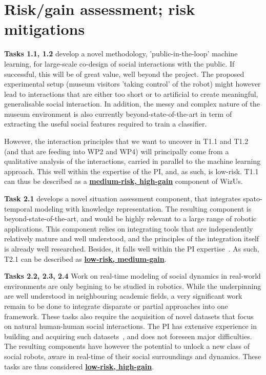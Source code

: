 \documentclass[11pt,a4paper]{report}
\newcommand{\project}{WizUs\xspace}
\begin{document}
\section{Risk/gain assessment; risk mitigations}\label{risks}

\textbf{Tasks 1.1, 1.2} develop a novel methodology, 'public-in-the-loop' machine
learning, for large-scale co-design of social interactions with the public. If
successful, this will be of great value, well beyond the project. The
proposed experimental setup (museum visitors 'taking control' of the robot)
might however lead to interactions that are either too short or to artificial to
create meaningful, generalisable social interaction. In addition, the messy and
complex nature of the museum environment is also currently beyond-state-of-the-art
in term of extracting the useful social features required to train a classifier.

However, the interaction principles that we want to uncover in T1.1 and T1.2
(and that are feeding into WP2 and WP4) will principally come from a qualitative
analysis of the interactions, carried in parallel to the machine learning
approach. This well within the expertise of the PI, and, as such, is low-risk.
T1.1 can thus be described as a \ul{\bf medium-risk, high-gain} component of
\project.

\vspace{1em}

\textbf{Task 2.1} develops a novel situation assessment component, that
integrates spato-temporal modeling with knowledge representation. The resulting
component is beyond-state-of-the-art, and would be highly relevant to a large range
of robotic applications. This component relies on integrating tools that are
independently relatively mature and well understood, and the principles of the
integration itself is already well researched. Besides, it falls well within the
PI
expertise~\cite{lemaignan2018underworlds,sallami2019simulation,lemaignan2010oro}.
As such, T2.1 can be described as \ul{\bf low-risk, medium-gain}.

\textbf{Tasks 2.2, 2.3, 2.4} Work on real-time modeling of social dynamics in
real-world environments are only begining to be studied in robotics. While the
underpinning are well understood in neighbouring academic fields, a very
significant work remain to be done to integrate disparate or partial approaches
into one framework. These tasks also require the acquisition of novel datasets
that focus on natural human-human social interactions. The PI has extensive
experience in building and acquiring such
datasets~\cite{lemaignan2018pinsoro,sallami2020unexpected}, and does not
foreseen major difficulties. The resulting components have however the potential
to unlock a new class of social robots, aware in real-time of their social
surroundings and dynamics.  These tasks are thus considered \ul{\bf low-risk,
high-gain}.
\end{document}

